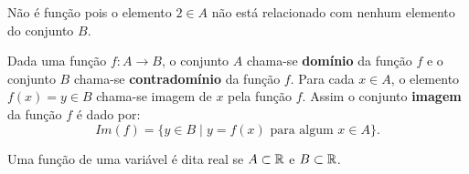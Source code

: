\begin{multicols}{2}
\begin{center}
\end{center}
Não é função pois o elemento $2 \in A$ não está relacionado com nenhum elemento do conjunto $B$.




\end{multicols}

Dada uma função $f: A \rightarrow B$, o conjunto $A$ chama-se \textbf{domínio} da função $f$ e o conjunto $B$ chama-se \textbf{contradomínio} da função $f$.  Para cada $x \in A$, o elemento $f(x)= y \in B$ chama-se imagem de $x$ pela função $f$. Assim o conjunto \textbf{imagem} da função $f$ é dado por:
\begin{equation*}
Im(f)= \{ y \in B \mid y = f(x) \text{ para algum } x \in A\} .
\end{equation*}

Uma função de uma variável é dita real se $A\subset \mathbb{R}$ e $B\subset \mathbb{R}$.


